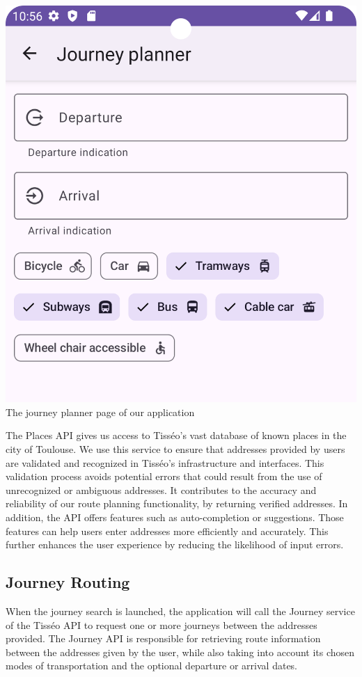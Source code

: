 \begin{center}
\includegraphics[scale=0.25]{content/journey.png}
\newline
The journey planner page of our application
\newline
\end{center}

The Places API gives us access to Tisséo's vast database of known places in the city of Toulouse. We use this service to ensure that addresses provided by users are validated and recognized in Tisséo's infrastructure and interfaces. This validation process avoids potential errors that could result from the use of unrecognized or ambiguous addresses. It contributes to the accuracy and reliability of our route planning functionality, by returning verified addresses.
In addition, the API offers features such as auto-completion or suggestions. Those features can help users enter addresses more efficiently and accurately. This further enhances the user experience by reducing the likelihood of input errors.\newline

\subsection{Journey Routing}
When the journey search is launched, the application will call the Journey service of the Tisséo API to request one or more journeys between the addresses provided. The Journey API is responsible for retrieving route information between the addresses given by the user, while also taking into account its chosen modes of transportation and the optional departure or arrival dates.\newline

